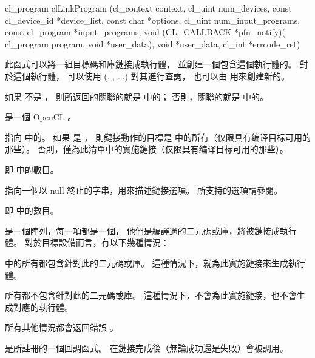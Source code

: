 
\startCLFUNC
cl_program clLinkProgram (cl_context context,
			cl_uint num_devices,
			const cl_device_id *device_list,
			const char *options,
			cl_uint num_input_programs,
			const cl_program *input_programs,
			void (CL_CALLBACK *pfn_notify)(
						cl_program program,
						void *user_data),
			void *user_data,
			cl_int *errcode_ret)
\stopCLFUNC

此函式可以將一組目標碼和庫鏈接成執行體，
並創建一個包含這個執行體的。
對於這個執行體，
可以使用 (, , ...) 對其進行查詢，
也可以由  用來創建新的。

如果  不是 ，
則所返回的關聯的就是  中的；
否則，關聯的就是  中的。

 是一個 OpenCL 。

 指向  中的。
如果  是 ，
則鏈接動作的目標是  中的所有（仅限具有编译目标可用的那些）。
否則，僅為此清單中的實施鏈接（仅限具有编译目标可用的那些）。

 即  中的數目。

 指向一個以 null 終止的字串，用來描述鏈接選項。
所支持的選項請參閱\insection[linkOption]。

 即  中的數目。

 是一個陣列，每一項都是一個，
他們是編譯過的二元碼或庫，將被鏈接成執行體。
對於目標設備而言，有以下幾種情況：
\startigBase
\item {} 中的所有都包含針對此的二元碼或庫。
這種情況下，就為此實施鏈接來生成執行體。

\item 所有都不包含針對此的二元碼或庫。
這種情況下，不會為此實施鏈接，也不會生成對應的執行體。

\item 所有其他情況都會返回錯誤 。
\stopigBase

 是所註冊的一個回調函式。
在鏈接完成後（無論成功還是失敗）會被調用。

